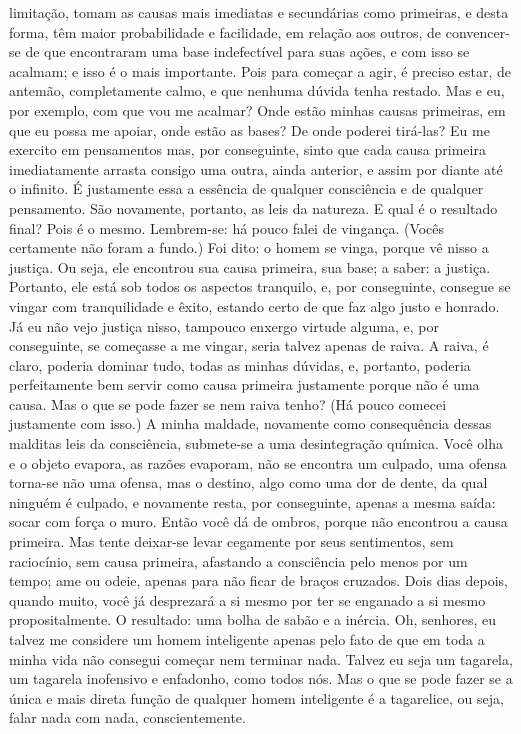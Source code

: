 limitação, tomam as causas mais imediatas e secundárias como primeiras,
e desta forma, têm maior probabilidade e facilidade, em relação aos
outros, de convencer-se de que encontraram uma base indefectível para
suas ações, e com isso se acalmam; e isso é o mais importante. Pois
para começar a agir, é preciso estar, de antemão, completamente calmo,
e que nenhuma dúvida tenha restado. Mas e eu, por exemplo, com que vou
me acalmar? Onde estão minhas causas primeiras, em que eu possa me
apoiar, onde estão as bases? De onde poderei tirá-las? Eu me exercito
em pensamentos mas, por conseguinte, sinto que cada causa primeira
imediatamente arrasta consigo uma outra, ainda anterior, e assim por
diante até o infinito. É justamente essa a essência de qualquer
consciência e de qualquer pensamento. São novamente, portanto, as leis
da natureza. E qual é o resultado final? Pois é o mesmo. Lembrem-se: há
pouco falei de vingança. (Vocês certamente não foram a fundo.) Foi
dito: o homem se vinga, porque vê nisso a justiça. Ou seja, ele
encontrou sua causa primeira, sua base; a saber: a justiça. Portanto,
ele está sob todos os aspectos tranquilo, e, por conseguinte, consegue
se vingar com tranquilidade e êxito, estando certo de que faz algo
justo e honrado. Já eu não vejo justiça nisso, tampouco enxergo virtude
alguma, e, por conseguinte, se começasse a me vingar, seria talvez
apenas de raiva. A raiva, é claro, poderia dominar tudo, todas as
minhas dúvidas, e, portanto, poderia perfeitamente bem servir como
causa primeira justamente porque não é uma causa. Mas o que se pode
fazer se nem raiva tenho? (Há pouco comecei justamente com isso.) A
minha maldade, novamente como consequência dessas malditas leis da
consciência, submete-se a uma desintegração química. Você olha e o
objeto evapora, as razões evaporam, não se encontra um culpado, uma
ofensa torna-se não uma ofensa, mas o destino, algo como uma dor de
dente, da qual ninguém é culpado, e novamente resta, por conseguinte,
apenas a mesma saída: socar com força o muro. Então você dá de ombros,
porque não encontrou a causa primeira. Mas tente deixar-se levar
cegamente por seus sentimentos, sem raciocínio, sem causa primeira,
afastando a consciência pelo menos por um tempo; ame ou odeie, apenas
para não ficar de braços cruzados. Dois dias depois, quando muito, você
já desprezará a si mesmo por ter se enganado a si mesmo
propositalmente. O resultado: uma bolha de sabão e a inércia. Oh,
senhores, eu talvez me considere um homem inteligente apenas pelo fato
de que em toda a minha vida não consegui começar nem terminar nada.
Talvez eu seja um tagarela, um tagarela inofensivo e enfadonho, como
todos nós. Mas o que se pode fazer se a única e mais direta função de
qualquer homem inteligente é a tagarelice, ou seja, falar nada com
nada, conscientemente.



